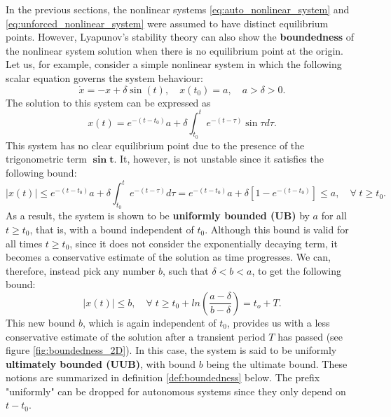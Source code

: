 In the previous sections, the nonlinear systems \eqref{eq:auto_nonlinear_system} and \eqref{eq:unforced_nonlinear_system} were assumed to have distinct equilibrium points. However, Lyapunov's stability theory can also show the \textbf{boundedness} of the nonlinear system solution when there is no equilibrium point at the origin. Let us, for example, consider a simple nonlinear system in which the following scalar equation governs the system behaviour:
\begin{equation}
  \dot{ x }=- x + \delta \sin{\left( t \right)}, \quad x \left(t_0\right)= a, \quad a > \delta > 0.
\end{equation}
The solution to this system can be expressed as
\begin{equation}
  x \left( t \right) = e^{-\left(t-t_0\right)} a + \delta \int_{t_0}^{t}e^{-\left( t - \tau \right)} \sin{\tau} d\tau.
\end{equation}
This system has no clear equilibrium point due to the presence of the trigonometric term $\boldsymbol{\sin{t}}$. It, however, is not unstable since it satisfies the following bound:
\begin{equation}
  \left| x \left( t \right)\right| \le e^{-\left( t -t_0\right)} a + \delta \int_{t_0}^{ t }e^{-\left( t - \tau \right)} d\tau = e^{-\left(t -t_0 \right)}a + \delta \left[ 1 -e^{-\left( t -t_0\right)} \right] \le a,
  \quad \forall \; t \ge t_0.
\end{equation}
As a result, the system is shown to be \textbf{uniformly bounded (UB)} by $a$ for all $t \geq t_0$, that is, with a bound independent of $t_0$. Although this bound is valid for all times $t \geq t_0$, since it does not consider the exponentially decaying term, it becomes a conservative estimate of the solution as time progresses. We can, therefore, instead pick any number $b$, such that $\delta < b < a$, to get the following bound:
\begin{equation}
  \left| x \left( t \right)\right|\le b ,\quad \forall \; t \geq t_0 + ln {\left(\frac{ a - \delta }{ b - \delta }\right)}= t_o + T.
\end{equation}
This new bound $b$, which is again independent of $t_0$, provides us with a less conservative estimate of the solution after a transient period $T$ has passed (see figure \ref{fig:boundedness_2D}). In this case, the system is said to be uniformly \textbf{ultimately bounded (UUB)}, with bound $b$ being the ultimate bound. These notions are summarized in definition \ref{def:boundedness} below. The prefix "uniformly" can be dropped for autonomous systems since they only depend on $t-t_0$.

